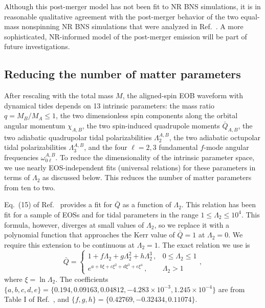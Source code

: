 \documentclass[prd,aps,letter,twocolumn,floatfix,notitlepage,nofootinbib]{revtex4-1}
\begin{document}
Although this post-merger model has not been fit to NR BNS simulations, it is in reasonable qualitative agreement with the post-merger behavior of the two equal-mass nonspinning NR BNS simulations that were analyzed in Ref.~\cite{Hinderer:2016eia}. A more sophisticated, NR-informed model of the post-merger emission will be part of future investigations.


\subsection{Reducing the number of matter parameters}

After rescaling with the total mass $M$, the aligned-spin EOB waveform with dynamical tides depends on 13 intrinsic parameters: the mass ratio $q=M_B/M_A\leq1$, the two dimensionless spin components along the orbital angular momentum $\chi_{A,B}$, the two spin-induced quadrupole moments $\bar Q_{A,B}$, the two adiabatic quadrupolar tidal polarizabilities $\Lambda_2^{A,B}$, the two adiabatic octupolar tidal polarizabilities $\Lambda_3^{A,B}$, and the four $\ell=2,3$ fundamental $f$-mode angular frequencies $\omega_{0\ell}^{A,B}$. To reduce the dimensionality of the intrinsic parameter space, we use nearly EOS-independent fits (universal relations) for these parameters in terms of $\Lambda_2$ as discussed below. This reduces the number of matter parameters from ten to two.

Eq.~(15) of Ref.~\cite{YagiYunes2017} provides a fit for $\bar Q$ as a function of $\Lambda_2$. This relation has been fit for a sample of EOSs and for tidal parameters in the range $1 \leq \Lambda_2\leq10^4$. This formula, however, diverges at small values of $\Lambda_2$, so we replace it with a polynomial function that approaches the Kerr value of $\bar Q = 1$ at $\Lambda_2 = 0$. We require this extension to be continuous at $\Lambda_2 = 1$. The exact relation we use is
\begin{equation}
\bar Q = \left\{\begin{array}{ll}
1 + f \Lambda_2 + g \Lambda_2^2 + h \Lambda_2^3\, , & 0 \leq \Lambda_2 \le 1 \\
e^{a + b \xi + c \xi^2 + d \xi^3 + e \xi^4}\, , & \Lambda_2 > 1
\end{array}\right.,
\end{equation}
where $\xi = \ln\Lambda_2$. The coefficients $\{a, b, c, d, e\} = \{ 0.194, 0.09163, 0.04812, -4.283\times 10^{-3}, 1.245\times 10^{-4} \}$ are from Table I of Ref.~\cite{YagiYunes2017}, and $\{f, g, h\} = \{0.42769, -0.32434, 0.11074\}$.
\end{document}
